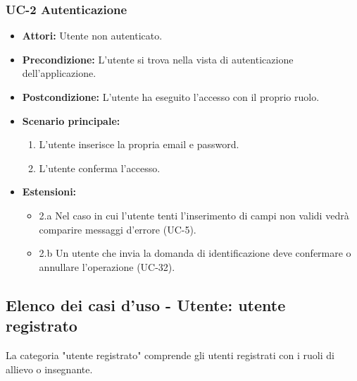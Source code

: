 \subsubsection{UC-2 Autenticazione}
		\begin{itemize}
			\item \textbf{Attori:} Utente non autenticato.
			\item \textbf{Precondizione:} L'utente si trova nella vista di autenticazione dell'applicazione.
			\item \textbf{Postcondizione:} L'utente ha eseguito l'accesso con il proprio ruolo.
			\item \textbf{Scenario principale:}
				\begin{enumerate}
					\item L'utente inserisce la propria email e password.
					\item L'utente conferma l'accesso.
				\end{enumerate}
				\item \textbf{Estensioni:}
				\begin{itemize}
					\item 2.a Nel caso in cui l'utente tenti l'inserimento di campi non validi vedrà comparire messaggi d'errore (UC-5).
					\item 2.b Un utente che invia la domanda di identificazione deve confermare o annullare l'operazione (UC-32).
				\end{itemize}
		\end{itemize}
		
\subsection{Elenco dei casi d'uso - Utente: utente registrato}	
La categoria "utente registrato" comprende gli utenti registrati con i ruoli di allievo o insegnante.	
